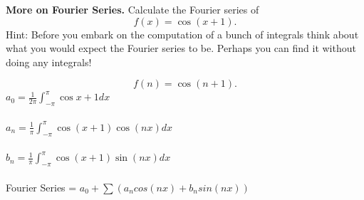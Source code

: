\textbf{More on Fourier Series.} Calculate the Fourier series
of \[f(x) = \cos(x + 1).\] Hint: Before you embark on the computation
of a bunch of integrals think about what you would expect the Fourier
series to be. Perhaps you can find it without doing any integrals!

{\color{blue}
 \[f(n) = \cos(n + 1).\]
\centering
$a_{0}=\frac{1}{2\pi}\int_{-\pi}^{\pi}\cos x+1 dx$ ~\\  ~\\
$a_{n}=\frac{1}{\pi}\int_{-\pi}^{\pi}\cos (x+1)\cos(nx)dx$ ~\\ ~\\
$b_{n}=\frac{1}{\pi}\int_{-\pi}^{\pi}\cos (x+1)\sin(nx)dx$ ~\\ ~\\
Fourier Series  =  $a_{0}+\sum (a_{n}cos(nx)+b_{n}sin(nx))$

}